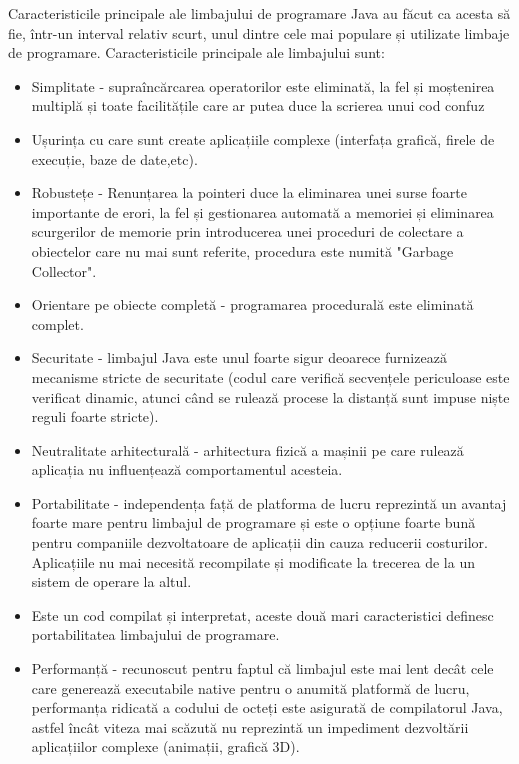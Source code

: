 \documentclass[12pt]{book}
\begin{document}
Caracteristicile principale ale limbajului de programare Java au făcut ca acesta să fie, într-un interval relativ scurt, unul dintre cele mai populare și utilizate limbaje de programare. Caracteristicile principale ale limbajului sunt:
\begin{addmargin}[4em]{1em}
	\begin{itemize}
		\item Simplitate - supraîncărcarea operatorilor este eliminată, la fel și moștenirea multiplă și toate facilitățile care ar putea duce la scrierea unui cod confuz
		\item Ușurința cu care sunt create aplicațiile complexe (interfața grafică, firele de execuție, baze de date,etc).
		\item Robustețe - Renunțarea la pointeri duce la eliminarea unei surse foarte importante de erori, la fel și gestionarea automată a memoriei și eliminarea scurgerilor de memorie prin introducerea unei proceduri de colectare a obiectelor care nu mai sunt referite, procedura este numită "Garbage Collector".
		\item	Orientare pe obiecte completă - programarea procedurală este eliminată complet.
		\item Securitate - limbajul Java este unul foarte sigur deoarece furnizează mecanisme stricte de securitate (codul care verifică secvențele periculoase este verificat dinamic, atunci când se rulează procese la distanță sunt impuse niște reguli foarte stricte).
		\item Neutralitate arhitecturală - arhitectura fizică a mașinii pe care rulează aplicația nu influențează comportamentul acesteia.
		\item Portabilitate - independența față de platforma de lucru reprezintă un avantaj foarte mare pentru limbajul de programare și este o opțiune foarte bună pentru companiile dezvoltatoare de aplicații din cauza reducerii costurilor. Aplicațiile nu mai necesită recompilate și modificate la trecerea de la un sistem de operare la altul.
		\item	Este un cod compilat și interpretat, aceste două mari caracteristici definesc portabilitatea limbajului de programare.
		\item Performanță - recunoscut pentru faptul că limbajul este mai lent decât cele care generează executabile native pentru o anumită platformă de lucru, performanța ridicată a codului de octeți este asigurată de compilatorul Java, astfel încât viteza mai scăzută nu reprezintă un impediment dezvoltării aplicațiilor complexe (animații, grafică 3D). \cite{cursPracticJava}
\end{itemize}
\end{addmargin}
\bigbreak
	
\end{document}
